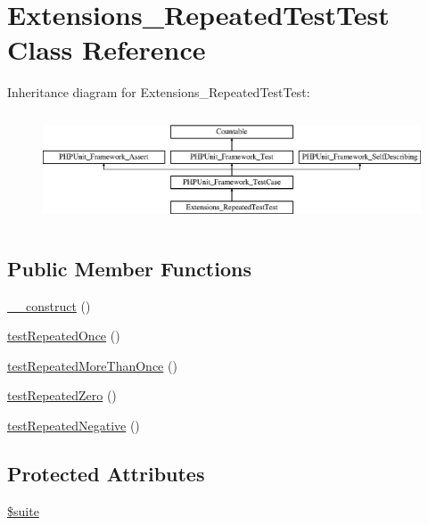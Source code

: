 \hypertarget{class_extensions___repeated_test_test}{}\section{Extensions\+\_\+\+Repeated\+Test\+Test Class Reference}
\label{class_extensions___repeated_test_test}
Inheritance diagram for Extensions\+\_\+\+Repeated\+Test\+Test\+:\begin{figure}[H]
\begin{center}
\leavevmode
\includegraphics[height=3.303835cm]{class_extensions___repeated_test_test}
\end{center}
\end{figure}
\subsection*{Public Member Functions}
\begin{DoxyCompactItemize}
\item 
\mbox{\hyperlink{class_extensions___repeated_test_test_a095c5d389db211932136b53f25f39685}{\+\_\+\+\_\+construct}} ()
\item 
\mbox{\hyperlink{class_extensions___repeated_test_test_af22b7eebcf431b5f29955610f0d84c7a}{test\+Repeated\+Once}} ()
\item 
\mbox{\hyperlink{class_extensions___repeated_test_test_a8baa808280ea616aae5694ca8b756a89}{test\+Repeated\+More\+Than\+Once}} ()
\item 
\mbox{\hyperlink{class_extensions___repeated_test_test_a717a9da59e1ea64ace892d8fc836b3ab}{test\+Repeated\+Zero}} ()
\item 
\mbox{\hyperlink{class_extensions___repeated_test_test_ade86e5567a6d397291b43a1c0d65d8cd}{test\+Repeated\+Negative}} ()
\end{DoxyCompactItemize}
\subsection*{Protected Attributes}
\begin{DoxyCompactItemize}
\item 
\mbox{\hyperlink{class_extensions___repeated_test_test_a902f79118bd76caa816154e42fe7af8b}{\$suite}}
\end{DoxyCompactItemize}
